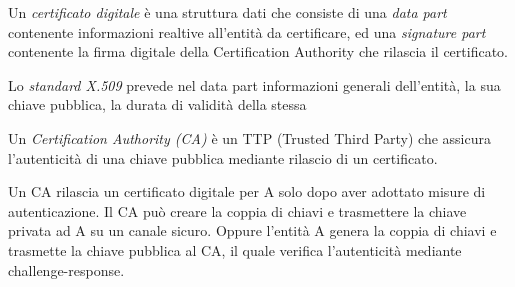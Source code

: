 Un \textit{certificato digitale} è una struttura dati che consiste di una \textit{data part} contenente informazioni realtive all'entità da certificare, ed una \textit{signature part} contenente la firma digitale della Certification Authority che rilascia il certificato.

Lo \textit{standard X.509} prevede nel data part informazioni generali dell'entità, la sua chiave pubblica, la durata di validità della stessa

Un \textit{Certification Authority (CA)} è un TTP (Trusted Third Party) che assicura l'autenticità di una chiave pubblica mediante rilascio di un certificato.

Un CA rilascia un certificato digitale per A solo dopo aver adottato misure di autenticazione. Il CA può creare la coppia di chiavi e trasmettere la chiave privata ad A su un canale sicuro. Oppure l'entità A genera la coppia di chiavi e trasmette la chiave pubblica al CA, il quale verifica l'autenticità mediante challenge-response.
